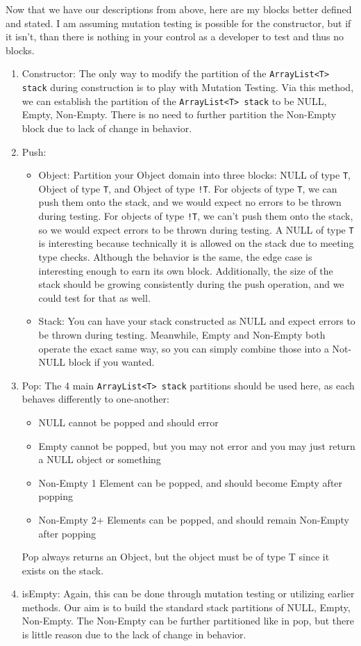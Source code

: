 \documentclass{article}
\newcommand{\Stack}{\texttt{ArrayList<T> stack} }
\begin{document}
Now that we have our descriptions from above, here are my blocks better defined and stated. I am assuming mutation testing is possible for the constructor, but if it isn't, than there is nothing in your control as a developer to test and thus no blocks.
\begin{enumerate}
    \item Constructor: The only way to modify the partition of the \Stack during construction is to play with Mutation Testing. Via this method, we can establish the partition of the \Stack to be NULL, Empty, Non-Empty. There is no need to further partition the Non-Empty block due to lack of change in behavior.
    \item Push:
    \begin{itemize}
        \item Object: Partition your Object domain into three blocks: NULL of type \texttt{T}, Object of type \texttt{T}, and Object of type \texttt{!T}. For objects of type \texttt{T}, we can push them onto the stack, and we would expect no errors to be thrown during testing. For objects of type \texttt{!T}, we can't push them onto the stack, so we would expect errors to be thrown during testing. A NULL of type \texttt{T} is interesting because technically it is allowed on the stack due to meeting type checks. Although the behavior is the same, the edge case is interesting enough to earn its own block. Additionally, the size of the stack should be growing consistently during the push operation, and we could test for that as well.
        \item Stack: You can have your stack constructed as NULL and expect errors to be thrown during testing. Meanwhile, Empty and Non-Empty both operate the exact same way, so you can simply combine those into a Not-NULL block if you wanted.
    \end{itemize}
    \item Pop: The 4 main \Stack partitions should be used here, as each behaves differently to one-another:
    \begin{itemize}
        \item NULL cannot be popped and should error
        \item Empty cannot be popped, but you may not error and you may just return a NULL object or something
        \item Non-Empty 1 Element can be popped, and should become Empty after popping
        \item Non-Empty 2+ Elements can be popped, and should remain Non-Empty after popping
    \end{itemize}
    Pop always returns an Object, but the object must be of type T since it exists on the stack.
    \item isEmpty: Again, this can be done through mutation testing or utilizing earlier methods. Our aim is to build the standard stack partitions of NULL, Empty, Non-Empty. The Non-Empty can be further partitioned like in pop, but there is little reason due to the lack of change in behavior.
\end{enumerate}
\end{document}
